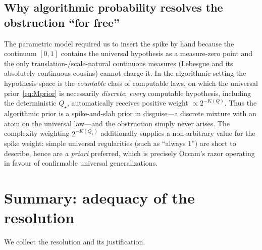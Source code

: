 \documentclass{amsart}
\theoremstyle{definition}
\begin{document}
\subsection{Why algorithmic probability resolves the obstruction
``for free''}
The parametric model required us to insert the spike by hand because the
continuum $[0,1]$ contains the universal hypothesis as a measure-zero point and
the only translation-/scale-natural continuous measures (Lebesgue and its
absolutely continuous cousins) cannot charge it. In the algorithmic setting the
hypothesis space is the \emph{countable} class of computable laws, on which the
universal prior~\eqref{eq:Mprior} is necessarily \emph{discrete}; \emph{every}
computable hypothesis, including the deterministic $Q_\star$, automatically
receives positive weight $\propto2^{-K(Q)}$. Thus the algorithmic prior is a
spike-and-slab prior in disguise---a discrete mixture with an atom on the
universal law---and the obstruction simply never arises. The complexity weighting
$2^{-K(Q_\star)}$ additionally supplies a non-arbitrary value for the spike
weight: simple universal regularities (such as ``always $1$'') are short to
describe, hence are \emph{a priori} preferred, which is precisely Occam's razor
operating in favour of confirmable universal generalizations.

\section{Summary: adequacy of the resolution}\label{sec:summary}

We collect the resolution and its justification.
\end{document}
